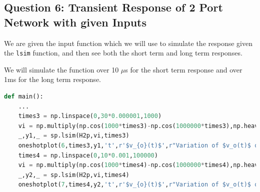 \documentclass[12pt]{article}
\begin{document}
\subsection{Question 6: Transient Response of 2 Port Network with given Inputs}
We are given the input function which we will use to simulate the response given the \texttt{lsim} function, and then see both the short term and long term responses.

We will simulate the function over 10 $\mu$s for the short term response and over 1ms for the long term response.

\begin{lstlisting}[language=Python]
def main():
    ...
    times3 = np.linspace(0,30*0.000001,1000)
    vi = np.multiply(np.cos(1000*times3)-np.cos(1000000*times3),np.heaviside(times3,0))
    _,y1,_ = sp.lsim(H2p,vi,times3)
    oneshotplot(6,times3,y1,'t',r'$v_{o}(t)$',r"Variation of $v_o(t)$ over 10$\mu$s")
    times4 = np.linspace(0,10*0.001,100000)
    vi = np.multiply(np.cos(1000*times4)-np.cos(1000000*times4),np.heaviside(times4,0))
    _,y2,_ = sp.lsim(H2p,vi,times4)
    oneshotplot(7,times4,y2,'t',r'$v_{o}(t)$',r"Variation of $v_o(t)$ over 1ms")
\end{lstlisting}
\end{document}
